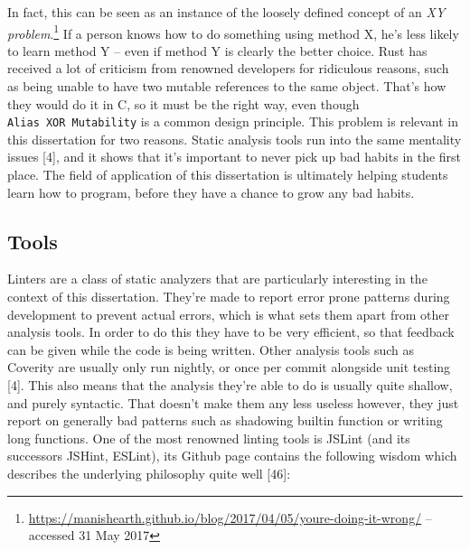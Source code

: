 \documentclass[a4paper, 16pt, oneside]{Thesis}
\begin{document}
In fact, this can be seen as an instance of the loosely defined concept
of an \emph{XY problem}.\footnote{\url{https://manishearth.github.io/blog/2017/04/05/youre-doing-it-wrong/}
  -- accessed 31 May 2017} If a person knows how to do something using
method X, he's less likely to learn method Y -- even if method Y is
clearly the better choice. Rust has received a lot of criticism from
renowned developers for ridiculous reasons, such as being unable to have
two mutable references to the same object. That's how they would do it
in C, so it must be the right way, even though
\texttt{Alias\ XOR\ Mutability} is a common design principle. This
problem is relevant in this dissertation for two reasons. Static
analysis tools run into the same mentality issues {[}4{]}, and it shows
that it's important to never pick up bad habits in the first place. The
field of application of this dissertation is ultimately helping students
learn how to program, before they have a chance to grow any bad habits.

\subsection{Tools}\label{tools-1}

Linters are a class of static analyzers that are particularly
interesting in the context of this dissertation. They're made to report
error prone patterns during development to prevent actual errors, which
is what sets them apart from other analysis tools. In order to do this
they have to be very efficient, so that feedback can be given while the
code is being written. Other analysis tools such as Coverity are usually
only run nightly, or once per commit alongside unit testing {[}4{]}.
This also means that the analysis they're able to do is usually quite
shallow, and purely syntactic. That doesn't make them any less useless
however, they just report on generally bad patterns such as shadowing
builtin function or writing long functions. One of the most renowned
linting tools is JSLint (and its successors JSHint, ESLint), its Github
page contains the following wisdom which describes the underlying
philosophy quite well {[}46{]}:

\begin{quote}
\end{quote}
\end{document}
